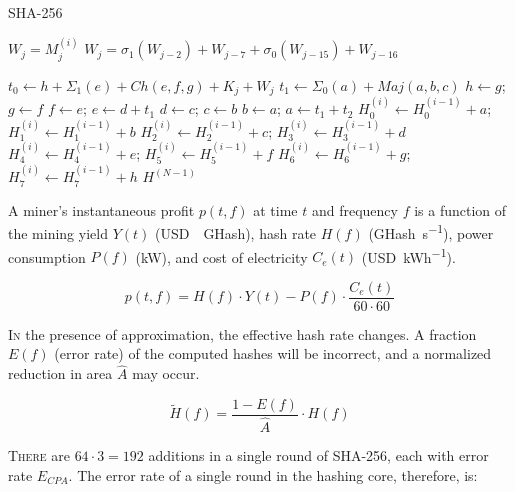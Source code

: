 \documentclass[portrait,a0,final]{a0poster}
\begin{document}
\begin{multicols}{3}
\hfill
\begin{algorithm}[H]
\caption{SHA-256}
\label{alg:sha256}
\begin{algorithmic}[1]

 \label{alg:line:expand}
\State $W_j = M^{(i)}_j$
\EndFor
{}
\State $W_j = \sigma_1(W_{j-2}) + W_{j-7} + \sigma_0(W_{j-15}) + W_{j-16}$
\EndFor

\Statex
{} \label{alg:line:compress}
\State $t_0 \gets h + \Sigma_1(e) + Ch(e,f,g) + K_j + W_j$
\State $t_1 \gets \Sigma_0(a) + Maj(a,b,c)$
\State $h \gets g$; $g \gets f$
\State $f \gets e$; $e \gets d + t_1$
\State $d \gets c$; $c \gets b$
\State $b \gets a$; $a \gets t_1 + t_2$
\Statex
\State $H^{(i)}_0 \gets H^{(i-1)}_0 + a$; $H^{(i)}_1 \gets H^{(i-1)}_1 + b$
\State $H^{(i)}_2 \gets H^{(i-1)}_2 + c$; $H^{(i)}_3 \gets H^{(i-1)}_3 + d$
\State $H^{(i)}_4 \gets H^{(i-1)}_4 + e$; $H^{(i)}_5 \gets H^{(i-1)}_5 + f$
\State $H^{(i)}_6 \gets H^{(i-1)}_6 + g$; $H^{(i)}_7 \gets H^{(i-1)}_7 + h$
\EndFor
\EndFor
\State \Return $H^{(N-1)}$
\EndFunction
\end{algorithmic}
\end{algorithm}

\hfill

\begin{tcolorbox}[title=Approximate Mining]
\lettrine{A}{} miner's instantaneous profit $p(t,f)$ at time $t$ and frequency $f$ is a function of the mining yield $Y(t)$ (\si{USD \per GHash}), hash rate $H(f)$ (\si{GHash\per\second}), power consumption $P(f)$ (\si{\kilo\watt}), and cost of electricity $C_e(t)$ (\si{USD\per\kWh}).

\begin{equation}
\label{eq:profit}
p(t,f) = H(f) \cdot Y(t) - P(f) \cdot \frac{C_e(t)}{60 \cdot 60}
\end{equation}

\lettrine{I}{n} the presence of approximation, the effective hash rate changes. A fraction $E(f)$ (error rate) of the computed hashes will be incorrect, and a normalized reduction in area $\hat{A}$ may occur.

\begin{equation}
\label{eq:hash_rate}
\tilde{H}(f) = \frac{1 - E(f)}{\hat{A}} \cdot H(f)
\end{equation}

\lettrine{T}{here} are $64 \cdot 3 = 192$ additions in a single round of SHA-256, each with error rate $E_{CPA}$. The error rate of a single round in the hashing core, therefore, is:


\end{tcolorbox}
\end{multicols}
\end{document}
